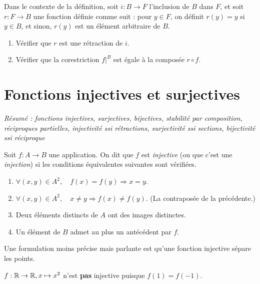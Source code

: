 \begin{exercice}
Dans le contexte de la définition, soit $i : B\to F$ l'inclusion de $B$ dans $F$, et soit $r : F\to B$ une fonction définie comme suit : pour $y\in F$, on définit $r(y)=y$ si $y\in B$, et sinon, $r(y)$ est un élément arbitraire de $B$. 
\begin{enumerate}
\item Vérifier que $r$ est une rétraction de $i$.
\item Vérifier que la corestriction $f|^{B}$ est égale à la composée $r\circ f$.
\end{enumerate}
\end{exercice}




\section{Fonctions injectives et surjectives}

\emph{Résumé : fonctions injectives, surjectives, bijectives, stabilité par composition, réciproques partielles, injectivité ssi rétractions, surjectivité ssi  sections, bijectivité ssi réciproque}



\begin{definition}
Soit $f : A \to B$ une application. On dit que $f$ est \emph{injective} (ou que c'est une \emph{injection}) si les conditions équivalentes suivantes sont vérifiées.
\begin{enumerate}
\item $\forall (x,y) \in A^2,\quad f(x)=f(y) \Rightarrow  x=y$.
\item $\forall (x,y) \in A^2,\quad x\neq y \Rightarrow  f(x)\neq f(y)$. (La contraposée de la précédente.)
\item Deux éléments distincts de $A$ ont des images distinctes. 
\item Un élément de $B$ admet au plus un antécédent par $f$.
\end{enumerate}
Une formulation moins précise mais parlante est qu'une fonction injective \og sépare les points\fg{}.
\end{definition}

\begin{exemple}
$f : \mathbb{R}\to \mathbb{R}, x\mapsto x^2$ n'est \textbf{pas} injective puisque $f(1)=f(-1)$.
\end{exemple}


